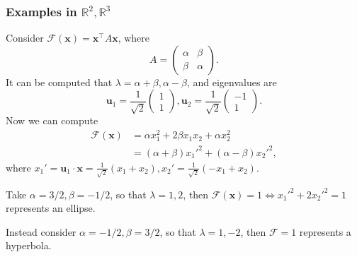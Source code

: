 \documentclass[a4paper]{article}
\begin{document}
    \subsubsection{Examples in $ \mathbb{R}^{2},\mathbb{R}^{3} $}
    \begin{example}[$ \mathbb{R}^{2} $]
      Consider $ \mathcal{F}(\mathbf{x})=\mathbf{x}^{\top}A\mathbf{x} $, where
      \[
        A=
        \begin{pmatrix}
          \alpha&\beta\\
          \beta&\alpha
        \end{pmatrix}.
      \]
      It can be computed that $ \lambda = \alpha+\beta,\alpha-\beta
      $, and eigenvalues are
      \[
        \mathbf{u}_1 = \frac{1}{\sqrt{2}}
        \begin{pmatrix}
          1\\1
        \end{pmatrix}, \mathbf{u}_2 = \frac{1}{\sqrt{2}}
        \begin{pmatrix}
          -1\\1
        \end{pmatrix}.
      \]
      Now we can compute
      \begin{align*}
        \mathcal{F}(\mathbf{x})&= \alpha x_1^2+2\beta x_1x_2+\alpha x_2^2\\
        &= (\alpha+\beta)x_1'^2+(\alpha-\beta)x_2'^2,
      \end{align*}
      where $ x_1' = \mathbf{u}_1 \cdot \mathbf{x} =
      \frac{1}{\sqrt{2}}(x_1+x_2), x_2'= \frac{1}{\sqrt{2}}(-x_1+x_2)$.

      Take $ \alpha=3/2,\beta=-1/2 $, so that $ \lambda=1,2 $, then $
      \mathcal{F}(\mathbf{x})=1 \Leftrightarrow x_1'^2+2x_2'^2=1 $
      represents an ellipse.

      Instead consider $ \alpha=-1/2, \beta=3/2 $, so that $
      \lambda=1,-2 $, then $ \mathcal{F}=1 $ represents a hyperbola.
    \end{example}
\end{document}
